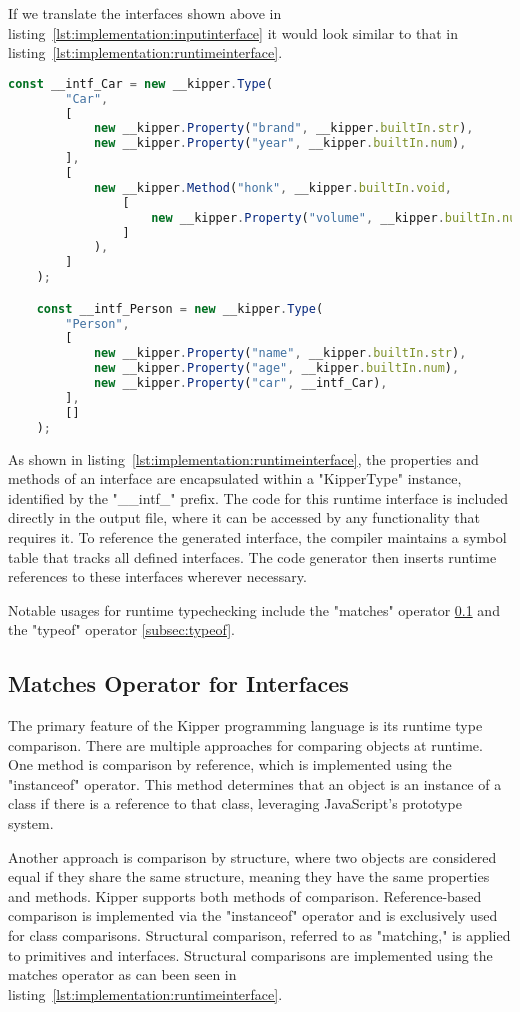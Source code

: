 If we translate the interfaces shown above in listing~\ref{lst:implementation:inputinterface} it would look similar to that in listing~\ref{lst:implementation:runtimeinterface}.

\begin{lstlisting}[language=Typescript,caption=The runtime representation of the previous interfaces,label=lst:implementation:runtimeinterface]
	const __intf_Car = new __kipper.Type(
		"Car",
		[
			new __kipper.Property("brand", __kipper.builtIn.str),
			new __kipper.Property("year", __kipper.builtIn.num),
		],
		[
			new __kipper.Method("honk", __kipper.builtIn.void,
				[
					new __kipper.Property("volume", __kipper.builtIn.num),
				]
			),
		]
	);

	const __intf_Person = new __kipper.Type(
		"Person",
		[
			new __kipper.Property("name", __kipper.builtIn.str),
			new __kipper.Property("age", __kipper.builtIn.num),
			new __kipper.Property("car", __intf_Car),
		],
		[]
	);
\end{lstlisting}

As shown in listing~\ref{lst:implementation:runtimeinterface}, the properties and methods of an interface are encapsulated within a "KipperType" instance, identified by the "\_\_intf\_" prefix. The code for this runtime interface is included directly in the output file, where it can be accessed by any functionality that requires it. To reference the generated interface, the compiler maintains a symbol table that tracks all defined interfaces. The code generator then inserts runtime references to these interfaces wherever necessary.

Notable usages for runtime typechecking include the "matches" operator \ref{subsec:matches} and the "typeof" operator \ref{subsec:typeof}.

\subsection{Matches Operator for Interfaces}
\label{subsec:matches}

The primary feature of the Kipper programming language is its runtime type comparison. There are multiple approaches for comparing objects at runtime. One method is comparison by reference, which is implemented using the "instanceof" operator. This method determines that an object is an instance of a class if there is a reference to that class, leveraging JavaScript's prototype system.

Another approach is comparison by structure, where two objects are considered equal if they share the same structure, meaning they have the same properties and methods. Kipper supports both methods of comparison. Reference-based comparison is implemented via the "instanceof" operator and is exclusively used for class comparisons. Structural comparison, referred to as "matching," is applied to primitives and interfaces. Structural comparisons are implemented using the matches operator as can been seen in listing~\ref{lst:implementation:runtimeinterface}.

